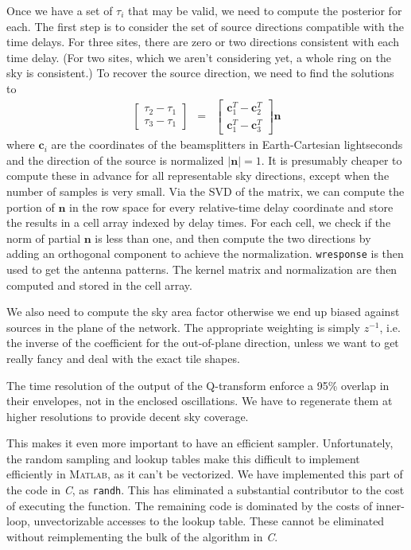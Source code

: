 \documentclass{article}
\begin{document}
Once we have a set of $\tau_i$ that may be valid, we need to compute the posterior for each.  The first step is to consider the set of source directions compatible with the time delays.  For three sites, there are zero or two directions consistent with each time delay.  (For two sites, which we aren't considering yet, a whole ring on the sky is consistent.)  To recover the source direction, we need to find the solutions to
\begin{eqnarray}
\left[\begin{array}{c}\tau_2-\tau_1\\\tau_3-\tau_1\end{array}\right]
&=&
\left[\begin{array}{c}\mathbf{c}^T_1-\mathbf{c}^T_2\\\mathbf{c}^T_1-\mathbf{c}^T_3\end{array}\right]
\mathbf{n}
\end{eqnarray}
where $\mathbf{c}_i$ are the coordinates of the beamsplitters in Earth-Cartesian lightseconds and the direction of the source is normalized $|\mathbf{n}|=1$.  It is presumably cheaper to compute these in advance for all representable sky directions, except when the number of samples is very small.  Via the SVD of the matrix, we can compute the portion of $\mathbf{n}$ in the row space for every relative-time delay coordinate and store the results in a cell array indexed by delay times.  For each cell, we check if the norm of partial $\mathbf{n}$ is less than one, and then compute the two directions by adding an orthogonal component to achieve the normalization.  \texttt{wresponse} is then used to get the antenna patterns.  The kernel matrix and normalization are then computed and stored in the cell array.

We also need to compute the sky area factor otherwise we end up biased against sources in the plane of the network.  The appropriate weighting is simply $z^{-1}$, i.e. the inverse of the coefficient for the out-of-plane direction, unless we want to get really fancy and deal with the exact tile shapes.

The time resolution of the output of the Q-transform enforce a 95\% overlap in their envelopes, not in the enclosed oscillations.  We have to regenerate them at higher resolutions to provide decent sky coverage.

This makes it even more important to have an efficient sampler.  Unfortunately, the random sampling and lookup tables make this difficult to implement efficiently in \textsc{Matlab}, as it can't be vectorized.  We have implemented this part of the code in \emph{C}, as \texttt{randh}.  This has eliminated a substantial contributor to the cost of executing the function.  The remaining code is dominated by the costs of inner-loop, unvectorizable accesses to the lookup table. These cannot be eliminated without reimplementing the bulk of the algorithm in \emph{C}.
\end{document}
